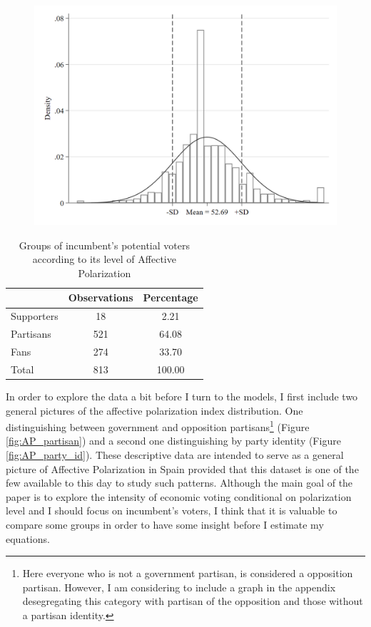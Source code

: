 \documentclass[a4paper, svgnames]{article}
\begin{document}
\begin{figure}[H]
	\centering
	\includegraphics[scale=0.3]{Figures/groupsHist.png}
\end{figure}


\begin{table}[H]
	\centering
	\caption{Groups of incumbent's potential voters according to its level of Affective Polarization}
	\label{tab:groups}
	\begin{tabular}{@{}lcc@{}}
		\toprule
		           & Observations & Percentage \\ \midrule
		Supporters & 18           & 2.21       \\
		Partisans  & 521          & 64.08      \\
		Fans       & 274          & 33.70      \\
		Total      & 813          & 100.00     \\ \bottomrule
	\end{tabular}
\end{table}

In order to explore the data a bit before I turn to the models, I first include two general pictures of the affective polarization index distribution. One distinguishing between government and opposition partisans\footnote{Here everyone who is not a government partisan, is considered a opposition partisan. However, I am considering to include a graph in the appendix desegregating this category with partisan of the opposition and those without a partisan identity.} (Figure \ref*{fig:AP_partisan}) and a second one distinguishing by party identity (Figure \ref*{fig:AP_party_id}). These descriptive data are intended to serve as a general picture of Affective Polarization in Spain provided that this dataset is one of the few available to this day to study such patterns. Although the main goal of the paper is to explore the intensity of economic voting conditional on polarization level and I should focus on incumbent's voters, I think that it is valuable to compare some groups in order to have some insight before I estimate my equations.
\end{document}
